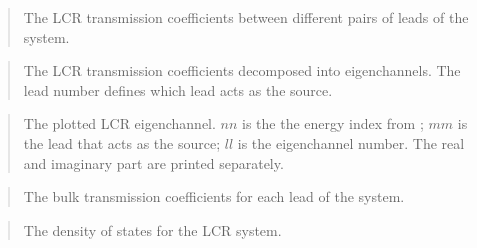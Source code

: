 \documentclass[letterpaper,10pt,english]{sphinxmanual}
\begin{document}
\begin{quote}

\begin{DUlineblock}{0em}
\item[] The LCR transmission coefficients between different pairs of leads
of the system.
\end{DUlineblock}
\end{quote}

\begin{quote}

\begin{DUlineblock}{0em}
\item[] The LCR transmission coefficients decomposed into eigenchannels.
The lead number defines which lead acts as the source.
\end{DUlineblock}
\end{quote}

\begin{quote}

\begin{DUlineblock}{0em}
\item[] The plotted LCR eigenchannel. \(nn\) is the the energy index
from ; \(mm\) is the lead
that acts as the source; \(ll\) is the eigenchannel number.
The real and imaginary part are printed separately.
\end{DUlineblock}
\end{quote}

\begin{quote}

\begin{DUlineblock}{0em}
\item[] The bulk transmission coefficients for each lead of the system.
\end{DUlineblock}
\end{quote}

\begin{quote}

\begin{DUlineblock}{0em}
\item[] The density of states for the LCR system.
\end{DUlineblock}
\end{quote}
\end{document}

